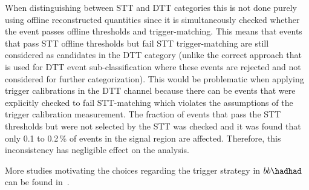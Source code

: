 When distinguishing between STT and DTT categories this is not done
purely using offline reconstructed quantities since it is
simultaneously checked whether the event passes offline thresholds and
trigger-matching. This means that events that pass STT offline
thresholds but fail STT trigger-matching are still considered as
candidates in the DTT category (unlike the correct approach that is
used for DTT event sub-classification where these events are rejected
and not considered for further categorization). This would be
problematic when applying \tauhad trigger calibrations in the DTT
channel because there can be events that were explicitly checked to
fail STT-matching which violates the assumptions of the \tauhad
trigger calibration measurement. The fraction of events that pass the
STT thresholds but were not selected by the STT was checked and it was
found that only 0.1 to 0.2\,\% of events in the signal region are
affected. Therefore, this inconsistency has negligible effect on the
analysis.

More studies motivating the choices regarding the trigger strategy in
$bb\hadhad$ can be found in~.
